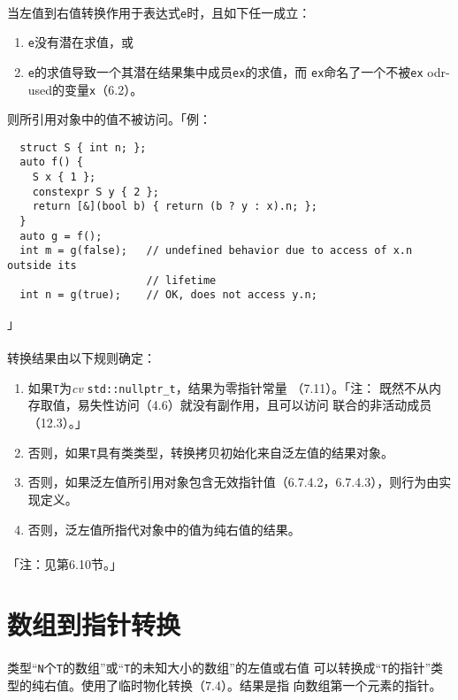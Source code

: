 \paragraph{}
当左值到右值转换作用于表达式\texttt{e}时，且如下任一成立：
\begin{enumerate}
  \item{\texttt{e}没有潜在求值，或}
  \item{\texttt{e}的求值导致一个其潜在结果集中成员\texttt{ex}的求值，而
    \texttt{ex}命名了一个不被\texttt{ex} odr-used的变量\texttt{x}（6.2）。}
\end{enumerate}
则所引用对象中的值不被访问。「例：
\begin{lstlisting}
  struct S { int n; };
  auto f() {
    S x { 1 };
    constexpr S y { 2 };
    return [&](bool b) { return (b ? y : x).n; };
  }
  auto g = f();
  int m = g(false);   // undefined behavior due to access of x.n outside its
                      // lifetime
  int n = g(true);    // OK, does not access y.n;
\end{lstlisting}」

\paragraph{}
转换结果由以下规则确定：
\begin{enumerate}
  \item{如果\texttt{T}为\textit{cv} \texttt{std::nullptr\_t}，结果为零指针常量
    （7.11）。「注： 既然不从内存取值，易失性访问（4.6）就没有副作用，且可以访问
    联合的非活动成员（12.3）。」}
  \item{否则，如果\texttt{T}具有类类型，转换拷贝初始化来自泛左值的结果对象。}
  \item{否则，如果泛左值所引用对象包含无效指针值（6.7.4.2，6.7.4.3），则行为由实
    现定义。}
  \item{否则，泛左值所指代对象中的值为纯右值的结果。}
\end{enumerate}

\paragraph{}
「注：见第6.10节。」

\section{数组到指针转换}
\paragraph{}
类型``\texttt{N}个\texttt{T}的数组''或``\texttt{T}的未知大小的数组''的左值或右值
可以转换成``\texttt{T}的指针''类型的纯右值。使用了临时物化转换（7.4）。结果是指
向数组第一个元素的指针。

